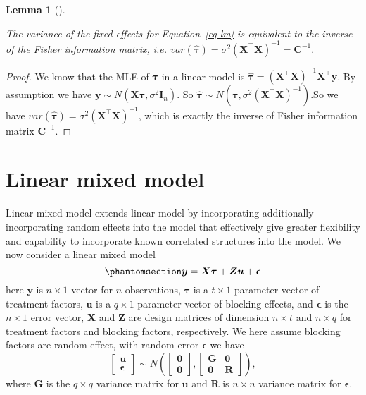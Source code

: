 \documentclass[
  a4paper,
  oneside,
  openany,
  12pt,
  onecolumn]{book}
\theoremstyle{plain}
\newtheorem{lemma}{Lemma}[chapter]
\theoremstyle{definition}
\theoremstyle{remark}
\begin{document}
\begin{lemma}[]\protect\hypertarget{lem-lm-var}{}\label{lem-lm-var}

The variance of the fixed effects for Equation~\ref{eq-lm} is equivalent
to the inverse of the Fisher information matrix, i.e.
\(var(\hat{\boldsymbol{\tau}})=\sigma^2(\boldsymbol{X}^\top\boldsymbol{X})^{-1} = \mathbf{C}^{-1}.\)

\end{lemma}

\begin{proof}
We know that the MLE of \(\boldsymbol{\tau}\) in a linear model is
\(\hat{\boldsymbol{\tau}}=(\boldsymbol{X}^\top\boldsymbol{X})^{-1}\boldsymbol{X}^\top\boldsymbol{y}\).
By assumption we have
\(\boldsymbol{y} \sim N(\mathbf{X}\boldsymbol{\tau}, \sigma^2\mathbf{I}_n)\).
So
\(\hat{\boldsymbol{\tau}}\sim N(\boldsymbol{\tau},\sigma^2(\boldsymbol{X}^\top\boldsymbol{X})^{-1})\).So
we have
\(var(\hat{\boldsymbol{\tau}}) = \sigma^2(\boldsymbol{X}^\top\boldsymbol{X})^{-1}\),
which is exactly the inverse of Fisher information matrix
\(\mathbf{C}^{-1}\).
\end{proof}

\section{Linear mixed model}\label{linear-mixed-model}

Linear mixed model extends linear model by incorporating additionally
incorporating random effects into the model that effectively give
greater flexibility and capability to incorporate known correlated
structures into the model. We now consider a linear mixed model
\begin{equation}\phantomsection\label{eq-lmm}{
\boldsymbol{y}=\boldsymbol{X}\boldsymbol{\tau}+\boldsymbol{Z}\boldsymbol{u}+\boldsymbol{\epsilon}
}\end{equation} here \(\boldsymbol{y}\) is \(n\times 1\) vector for
\(n\) observations, \(\boldsymbol{\tau}\) is a \(t\times1\) parameter
vector of treatment factors, \(\boldsymbol{u}\) is a \(q \times1\)
parameter vector of blocking effects, and \(\boldsymbol{\epsilon}\) is
the \(n\times 1\) error vector, \(\boldsymbol{X}\) and
\(\boldsymbol{Z}\) are design matrices of dimension \(n \times t\) and
\(n \times q\) for treatment factors and blocking factors, respectively.
We here assume blocking factors are random effect, with random error
\(\boldsymbol{\epsilon}\) we have \[
\begin{bmatrix}
\boldsymbol{u} \\
\boldsymbol{\epsilon} 
\end{bmatrix}
\sim
N\left(
\begin{bmatrix}
\boldsymbol{0} \\
\boldsymbol{0}
\end{bmatrix}
,
\begin{bmatrix}
\boldsymbol{G} & \mathbf{0} \\
\mathbf{0} & \boldsymbol{R}
\end{bmatrix}
\right),
\] where \(\boldsymbol{G}\) is the \(q \times q\) variance matrix for
\(\boldsymbol{u}\) and \(\boldsymbol{R}\) is \(n\times n\) variance
matrix for \(\boldsymbol{\epsilon}\).
\end{document}
